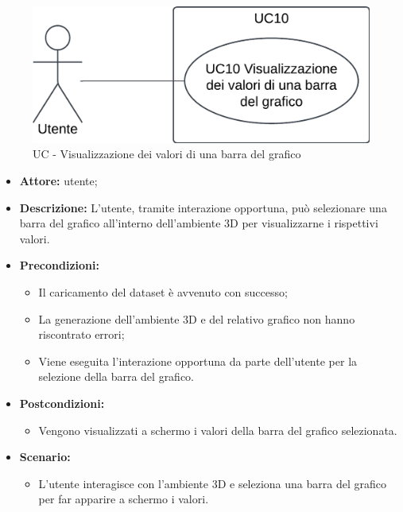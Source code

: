 \begin{figure}[h!]\centering
    \includegraphics[scale=0.7]{template/images/UC10.png}
    \caption{UC - Visualizzazione dei valori di una barra del grafico}
\end{figure}
\begin{itemize}    
    \item \textbf{Attore:} utente;
    \item \textbf{Descrizione:} L'utente, tramite interazione opportuna, può selezionare una barra del grafico all'interno dell'ambiente 3D per visualizzarne i rispettivi valori.
    \item \textbf{Precondizioni:}    
        \begin{itemize}
            \item Il caricamento del dataset è avvenuto con successo;
            \item La generazione dell'ambiente 3D e del relativo grafico non hanno riscontrato errori;
            \item Viene eseguita l'interazione opportuna da parte dell'utente per la selezione della barra del grafico.
        \end{itemize}    
    \item \textbf{Postcondizioni:}
        \begin{itemize}
            \item Vengono visualizzati a schermo i valori della barra del grafico selezionata.
        \end{itemize}    
    \item \textbf{Scenario:} 
        \begin{itemize}
            \item L'utente interagisce con l'ambiente 3D e seleziona una barra del grafico per far apparire a schermo i valori.
        \end{itemize}
\end{itemize}



